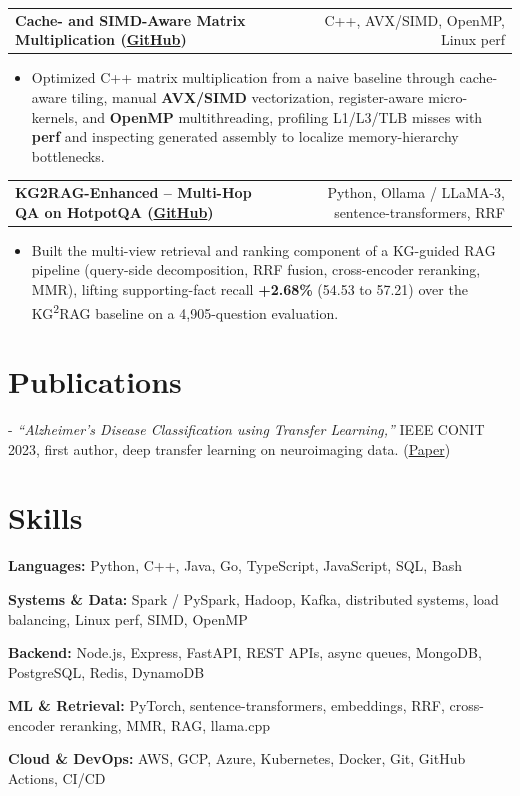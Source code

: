 \documentclass[letterpaper,11pt]{article}
\makeatletter
\newcommand{\projItem}[2]{%
  \vspace{2pt}
  \begin{tabular*}{\textwidth}{@{}l@{\extracolsep{\fill}}r@{}}
    \textbf{#1} & #2 \\
  \end{tabular*}\par\vspace{-3pt}
}
\newcommand{\skillLine}[2]{\textbf{#1:} #2\par\vspace{1.5pt}}
\newcommand{\inlineBlock}[1]{{\setlength{\leftskip}{0.18in}\small #1\par}}
\makeatother
\begin{document}
\projItem{Cache- and SIMD-Aware Matrix Multiplication {\normalfont\small(\href{https://github.com/Deva-1903/cs690pf}{GitHub})}}{C++, AVX/SIMD, OpenMP, Linux perf}
\begin{itemize}
  \item Optimized C++ matrix multiplication from a naive baseline through cache-aware tiling, manual \textbf{AVX/SIMD} vectorization, register-aware micro-kernels, and \textbf{OpenMP} multithreading, profiling L1/L3/TLB misses with \textbf{perf} and inspecting generated assembly to localize memory-hierarchy bottlenecks.
\end{itemize}

\projItem{KG2RAG-Enhanced -- Multi-Hop QA on HotpotQA {\normalfont\small(\href{https://github.com/Deva-1903/KG2RAG-685-NLP}{GitHub})}}{Python, Ollama / LLaMA-3, sentence-transformers, RRF}
\begin{itemize}
  \item Built the multi-view retrieval and ranking component of a KG-guided RAG pipeline (query-side decomposition, RRF fusion, cross-encoder reranking, MMR), lifting supporting-fact recall \textbf{+2.68\%} (54.53 to 57.21) over the KG\textsuperscript{2}RAG baseline on a 4{,}905-question evaluation.
\end{itemize}

\section{Publications}
\vspace{2pt}
\inlineBlock{- \textit{``Alzheimer's Disease Classification using Transfer Learning,''} IEEE CONIT 2023, first author, deep transfer learning on neuroimaging data. {\normalfont\small(\href{https://ieeexplore.ieee.org/document/10205760}{Paper})}}

\section{Skills}
\skillLine{Languages}{Python, C++, Java, Go, TypeScript, JavaScript, SQL, Bash}
\skillLine{Systems \& Data}{Spark / PySpark, Hadoop, Kafka, distributed systems, load balancing, Linux perf, SIMD, OpenMP}
\skillLine{Backend}{Node.js, Express, FastAPI, REST APIs, async queues, MongoDB, PostgreSQL, Redis, DynamoDB}
\skillLine{ML \& Retrieval}{PyTorch, sentence-transformers, embeddings, RRF, cross-encoder reranking, MMR, RAG, llama.cpp}
\skillLine{Cloud \& DevOps}{AWS, GCP, Azure, Kubernetes, Docker, Git, GitHub Actions, CI/CD}
\end{document}
